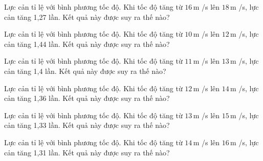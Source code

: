 \begin{ex}
Lực cản tỉ lệ với bình phương tốc độ. Khi tốc độ tăng từ $16\,\text{m}$ /s lên $18\,\text{m}$ /s, lực cản tăng 1,27 lần. Kết quả này được suy ra thế nào?
\end{ex}

\begin{ex}
Lực cản tỉ lệ với bình phương tốc độ. Khi tốc độ tăng từ $10\,\text{m}$ /s lên $12\,\text{m}$ /s, lực cản tăng 1,44 lần. Kết quả này được suy ra thế nào?
\end{ex}

\begin{ex}
Lực cản tỉ lệ với bình phương tốc độ. Khi tốc độ tăng từ $11\,\text{m}$ /s lên $13\,\text{m}$ /s, lực cản tăng 1,4 lần. Kết quả này được suy ra thế nào?
\end{ex}

\begin{bt}
Lực cản tỉ lệ với bình phương tốc độ. Khi tốc độ tăng từ $12\,\text{m}$ /s lên $14\,\text{m}$ /s, lực cản tăng 1,36 lần. Kết quả này được suy ra thế nào?
\end{bt}

\begin{bt}
Lực cản tỉ lệ với bình phương tốc độ. Khi tốc độ tăng từ $13\,\text{m}$ /s lên $15\,\text{m}$ /s, lực cản tăng 1,33 lần. Kết quả này được suy ra thế nào?
\end{bt}

\begin{bt}
Lực cản tỉ lệ với bình phương tốc độ. Khi tốc độ tăng từ $14\,\text{m}$ /s lên $16\,\text{m}$ /s, lực cản tăng 1,31 lần. Kết quả này được suy ra thế nào?
\end{bt}

